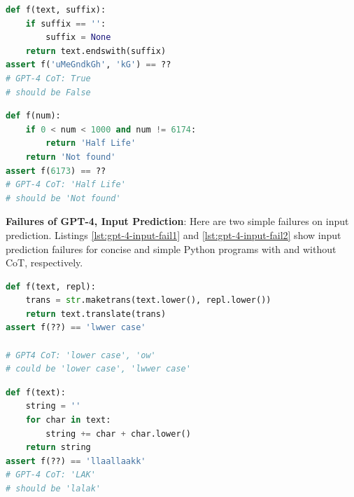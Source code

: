 \noindent\begin{minipage}[t]{.47\textwidth}
\vspace{0pt}
\begin{lstlisting}[caption=GPT-4 CoT output,label={lst:gpt-4-output-fail1}, breaklines=true, language=python]
def f(text, suffix):
    if suffix == '':
        suffix = None
    return text.endswith(suffix)
assert f('uMeGndkGh', 'kG') == ??
# GPT-4 CoT: True
# should be False
\end{lstlisting}
\end{minipage}\hfill
\begin{minipage}[t]{.47\textwidth}
\vspace{0pt}
\begin{lstlisting}[caption=GPT-4 CoT output,label={lst:gpt-4-output-fail2}, breaklines=true, language=python]
def f(num):
    if 0 < num < 1000 and num != 6174:
        return 'Half Life'
    return 'Not found'
assert f(6173) == ??
# GPT-4 CoT: 'Half Life'
# should be 'Not found'
\end{lstlisting}
\end{minipage}

\textbf{Failures of GPT-4, Input Prediction}: Here are two simple failures on input prediction. Listings \ref{lst:gpt-4-input-fail1} and \ref{lst:gpt-4-input-fail2} show input prediction failures for concise and simple Python programs with and without CoT, respectively.

\noindent\begin{minipage}[t]{.47\textwidth}
\vspace{0pt}
\begin{lstlisting}[caption=GPT-4 CoT input,label={lst:gpt-4-input-fail1}, breaklines=true, language=python]
def f(text, repl):
    trans = str.maketrans(text.lower(), repl.lower())
    return text.translate(trans)
assert f(??) == 'lwwer case'

# GPT4 CoT: 'lower case', 'ow'
# could be 'lower case', 'lwwer case'
\end{lstlisting}
\end{minipage}\hfill
\begin{minipage}[t]{.47\textwidth}
\vspace{0pt}
\begin{lstlisting}[caption=GPT-4 CoT input,label={lst:gpt-4-input-fail2}, breaklines=true, language=python]
def f(text):
    string = ''
    for char in text:
        string += char + char.lower()
    return string
assert f(??) == 'llaallaakk'
# GPT-4 CoT: 'LAK'
# should be 'lalak'
\end{lstlisting}
\end{minipage}
\endgroup


